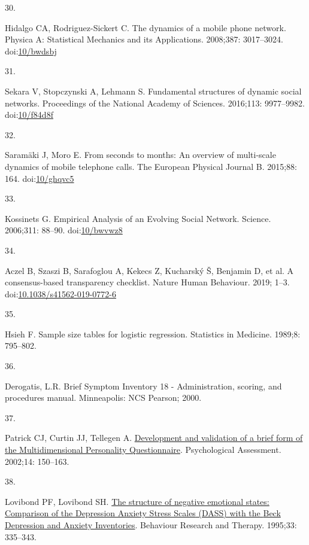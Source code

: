 \documentclass[
  letterpaper,
  DIV=11,
  numbers=noendperiod]{scrartcl}
\newlength{\cslhangindent}
\newlength{\csllabelwidth}
\newenvironment{CSLReferences}[2] %
 {\begin{list}{}{%
  \setlength{\itemindent}{0pt}
  \setlength{\leftmargin}{0pt}
  \setlength{\parsep}{0pt}
  \ifodd #1
   \setlength{\leftmargin}{\cslhangindent}
   \setlength{\itemindent}{-1\cslhangindent}
  \fi
  \setlength{\itemsep}{#2\baselineskip}}}
 {\end{list}}
\newcommand{\CSLLeftMargin}[1]{\parbox[t]{\csllabelwidth}{\strut#1\strut}}
\newcommand{\CSLRightInline}[1]{\parbox[t]{\linewidth - \csllabelwidth}{\strut#1\strut}}
\begin{document}
\begin{CSLReferences}{0}{1}
\CSLLeftMargin{30. }%
\CSLRightInline{Hidalgo CA, Rodriguez-Sickert C. The dynamics of a
mobile phone network. Physica A: Statistical Mechanics and its
Applications. 2008;387: 3017--3024.
doi:\href{https://doi.org/10/bwdsbj}{10/bwdsbj}}

\CSLLeftMargin{31. }%
\CSLRightInline{Sekara V, Stopczynski A, Lehmann S. Fundamental
structures of dynamic social networks. Proceedings of the National
Academy of Sciences. 2016;113: 9977--9982.
doi:\href{https://doi.org/10/f84d8f}{10/f84d8f}}

\CSLLeftMargin{32. }%
\CSLRightInline{Saramäki J, Moro E. From seconds to months: An overview
of multi-scale dynamics of mobile telephone calls. The European Physical
Journal B. 2015;88: 164.
doi:\href{https://doi.org/10/ghqvc5}{10/ghqvc5}}

\CSLLeftMargin{33. }%
\CSLRightInline{Kossinets G. Empirical {Analysis} of an {Evolving Social
Network}. Science. 2006;311: 88--90.
doi:\href{https://doi.org/10/bwvwz8}{10/bwvwz8}}

\CSLLeftMargin{34. }%
\CSLRightInline{{Aczel B, Szaszi B, Sarafoglou A, Kekecs Z, Kucharský Š,
Benjamin D, et al.} A consensus-based transparency checklist. Nature
Human Behaviour. 2019; 1--3.
doi:\href{https://doi.org/10.1038/s41562-019-0772-6}{10.1038/s41562-019-0772-6}}

\CSLLeftMargin{35. }%
\CSLRightInline{Hsieh F. Sample size tables for logistic regression.
Statistics in Medicine. 1989;8: 795--802. }

\CSLLeftMargin{36. }%
\CSLRightInline{Derogatis, L.R. Brief {Symptom Inventory} 18 -
{Administration}, scoring, and procedures manual. Minneapolis: NCS
Pearson; 2000. }

\CSLLeftMargin{37. }%
\CSLRightInline{Patrick CJ, Curtin JJ, Tellegen A.
\href{https://www.ncbi.nlm.nih.gov/pubmed/12056077}{Development and
validation of a brief form of the {Multidimensional Personality
Questionnaire}}. Psychological Assessment. 2002;14: 150--163. }

\CSLLeftMargin{38. }%
\CSLRightInline{Lovibond PF, Lovibond SH.
\href{https://www.ncbi.nlm.nih.gov/pubmed/7726811}{The structure of
negative emotional states: Comparison of the {Depression Anxiety Stress
Scales} ({DASS}) with the {Beck Depression} and {Anxiety Inventories}}.
Behaviour Research and Therapy. 1995;33: 335--343. }


\end{CSLReferences}
\end{document}
